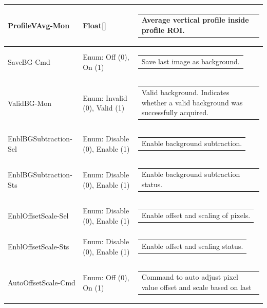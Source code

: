 \documentclass[openany]{article}
\begin{document}
\begin{longtable}{| m{3.0cm} m{4.5cm}  m{7.0cm} |}
        ProfileVAvg-Mon & Float[] & \begin{tabular}{@{}m{6cm}@{}}
                Average vertical profile inside profile ROI.
            \end{tabular} \hypertarget{pv:save-bg}{}\\ \hline
        SaveBG-Cmd & Enum: Off (0), On (1) & \begin{tabular}{@{}m{6cm}@{}}
                Save last image as background.
            \end{tabular} \hypertarget{pv:valid-bg}{}\\ \hline
        ValidBG-Mon & Enum: Invalid (0), Valid (1) & \begin{tabular}{@{}m{6cm}@{}}
                Valid background. Indicates whether a valid background was successfully
                acquired.
            \end{tabular} \hypertarget{pv:enbl-bg-subtraction}{}\\ \hline
        EnblBGSubtraction-Sel & Enum: Disable (0), Enable (1) & \begin{tabular}{@{}m{6cm}@{}}
                Enable background subtraction.
            \end{tabular} \\ \hline
        EnblBGSubtraction-Sts & Enum: Disable (0), Enable (1) & \begin{tabular}{@{}m{6cm}@{}}
                Enable background subtraction status.
            \end{tabular} \hypertarget{pv:enbl-offset-scale}{}\\ \hline
        EnblOffsetScale-Sel & Enum: Disable (0), Enable (1) & \begin{tabular}{@{}m{6cm}@{}}
                Enable offset and scaling of pixels.
            \end{tabular} \\ \hline
        EnblOffsetScale-Sts & Enum: Disable (0), Enable (1) & \begin{tabular}{@{}m{6cm}@{}}
                Enable offset and scaling status.
            \end{tabular} \hypertarget{pv:auto-offset-scale}{}\\ \hline
        AutoOffsetScale-Cmd & Enum: Off (0), On (1) & \begin{tabular}{@{}m{6cm}@{}}
                Command to auto adjust pixel value offset and scale based on last

\end{tabular}
\end{longtable}
\end{document}
